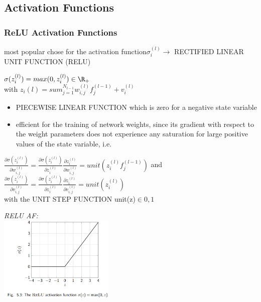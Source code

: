 \begin{sectionbox}
\subsection{Activation Functions}
\subsubsection*{ReLU Activation Functions}
most popular chose for the activation function$\sigma_i^{(l)}\rightarrow$ RECTIFIED LINEAR UNIT FUNCTION (RELU)\\
\begin{emphbox}
$\sigma(z_i^{(l)})=max(0,z_i^{(l)})\in \R_+$\\
with $z_i{(l)}=sum_{j=1}^{N_{l-1}}w_{i,j}^{(l)}f_j^{(l-1)}+v_i^{(l)}$
\end{emphbox}
\begin{itemize}
\item PIECEWISE LINEAR FUNCTION which is zero for a negative state variable
\item efficient for the training of network weights, since its gradient with respect to the weight parameters does not experience any saturation for large positive values of the state variable, i.e.
\end{itemize}
\begin{emphbox}
$\frac{\partial \sigma(z_i^{(l)})}{\partial w_{i,j}^{(l)}}=\frac{\partial\sigma(z_i^{(l)})}{\partial z_i^{(l)}}\frac{\partial z_i^{(l)}}{\partial w_{i,j}^{(l)}}=unit(z_i^{(l)}f_j^{(l-1)})$ and\\
$\frac{\partial \sigma(z_i^{(l)})}{\partial v_{i,j}^{(l)}}=\frac{\partial\sigma(z_i^{(l)})}{\partial z_i^{(l)}}\frac{\partial z_i^{(l)}}{\partial v_{i,j}^{(l)}}=unit(z_i^{(l)})$\\
with the UNIT STEP FUNCTION unit(z)$\in{0,1}$
\end{emphbox}
\parbox{5.5cm}{\emph{RELU AF:}\\ \includegraphics[width = 5.5cm]{./img/relu_af}}

\end{sectionbox}


